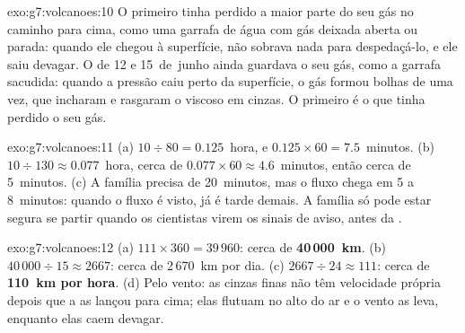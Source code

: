 \begin{solution}{exo:g7:volcanoes:10}
O primeiro  tinha perdido a maior parte do seu gás no caminho para
cima, como uma garrafa de água com gás deixada aberta ou parada: quando ele
chegou à superfície, não sobrava nada para despedaçá-lo, e ele saiu
devagar. O  de 12 e 15~de~junho ainda guardava o seu gás, como a
garrafa sacudida: quando a pressão caiu perto da superfície, o gás formou
bolhas de uma vez, que incharam e rasgaram o  viscoso em cinzas. O
primeiro  é o que tinha perdido o seu gás.
\end{solution}

\begin{solution}{exo:g7:volcanoes:11}
(a) $10 \div 80 = 0.125$~hora, e $0.125 \times 60 = 7.5$~minutos. (b)
$10 \div 130 \approx 0.077$~hora, cerca de $0.077 \times 60 \approx
4.6$~minutos, então cerca de 5~minutos. (c) A família precisa de
20~minutos, mas o fluxo chega em 5 a 8~minutos: quando o fluxo é visto, já
é tarde demais. A família só pode estar segura se partir quando os
cientistas virem os sinais de aviso, antes da .
\end{solution}

\begin{solution}{exo:g7:volcanoes:12}
(a) $111 \times 360 = 39\,960$: cerca de \textbf{40\,000~km}. (b)
$40\,000 \div 15 \approx 2667$: cerca de 2\,670~km por dia. (c)
$2667 \div 24 \approx 111$: cerca de \textbf{110~km por hora}. (d) Pelo
vento: as cinzas finas não têm velocidade própria depois que a  as
lançou para cima; elas flutuam no alto do ar e o vento as leva, enquanto
elas caem devagar.
\end{solution}

